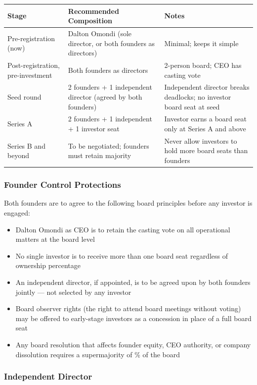 \documentclass[12pt,a4paper]{article}
\newcommand{\blank}[1][5.5cm]{\underline{\hspace{#1}}}
\begin{document}
\begin{tabularx}{\linewidth}{L{3cm} L{5cm} X}
  \toprule
  \textbf{Stage} & \textbf{Recommended Composition} & \textbf{Notes} \\
  \midrule
  Pre-registration (now) & Dalton Omondi (sole director, or both founders as directors) & Minimal; keeps it simple \\[0.5em]
  Post-registration, pre-investment & Both founders as directors & 2-person board; CEO has casting vote \\[0.5em]
  Seed round & 2 founders + 1 independent director (agreed by both founders) & Independent director breaks deadlocks; no investor board seat at seed \\[0.5em]
  Series A & 2 founders + 1 independent + 1 investor seat & Investor earns a board seat only at Series A and above \\[0.5em]
  Series B and beyond & To be negotiated; founders must retain majority & Never allow investors to hold more board seats than founders \\
  \bottomrule
\end{tabularx}

\subsubsection{Founder Control Protections}

Both founders are to agree to the following board principles before any investor is engaged:

\begin{itemize}
  \item Dalton Omondi as CEO is to retain the casting vote on all operational matters at the board level
  \item No single investor is to receive more than one board seat regardless of ownership percentage
  \item An independent director, if appointed, is to be agreed upon by both founders jointly --- not selected by any investor
  \item Board observer rights (the right to attend board meetings without voting) may be offered to early-stage investors as a concession in place of a full board seat
  \item Any board resolution that affects founder equity, CEO authority, or company dissolution requires a supermajority of \blank[2cm]\% of the board
\end{itemize}

\subsubsection{Independent Director}
\end{document}

